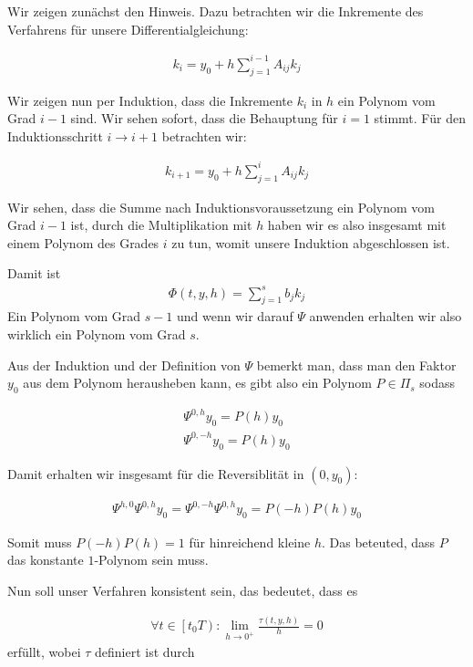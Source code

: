 \begin{solution}
  Wir zeigen zunächst den Hinweis. Dazu betrachten wir die Inkremente des Verfahrens
  für unsere Differentialgleichung:

  \begin{align*}
    k_i = y_0 + h \sum_{j=1}^{i-1}A_{ij}k_j
  \end{align*}

  Wir zeigen nun per Induktion, dass die Inkremente $k_i$ in $h$ ein Polynom vom Grad
  $i-1$ sind. Wir sehen sofort, dass die Behauptung für $i=1$ stimmt. Für den
  Induktionsschritt $i \rightarrow i+1$ betrachten wir:

  \begin{align*}
    k_{i+1} = y_0 + h \sum_{j=1}^iA_{ij}k_j
  \end{align*}

  Wir sehen, dass die Summe nach Induktionsvoraussetzung ein Polynom vom Grad
  $i-1$ ist, durch die Multiplikation mit $h$ haben wir es also insgesamt mit einem
  Polynom des Grades $i$ zu tun, womit unsere Induktion abgeschlossen ist.

  Damit ist
  \begin{align*}
    \Phi(t,y,h) = \sum_{j=1}^s b_j k_j
  \end{align*}
  Ein Polynom vom Grad $s-1$ und wenn wir darauf $\Psi$ anwenden erhalten wir also
  wirklich ein Polynom vom Grad $s$.

  Aus der Induktion und der Definition von $\Psi$ bemerkt man, dass man den Faktor
  $y_0$ aus dem Polynom herausheben kann, es gibt also ein Polynom $P \in \Pi_s$
  sodass

  \begin{align*}
    \Psi^{0,h} y_0 = P(h)y_0 \\
    \Psi^{0,-h} y_0 = P(h)y_0
  \end{align*}

  Damit erhalten wir insgesamt für die Reversiblität in $(0,y_0)$:

  \begin{align*}
    \Psi^{h,0}\Psi^{0,h}y_0 = \Psi^{0,-h}\Psi^{0,h}y_0
    = P(-h)P(h)y_0
  \end{align*}

  Somit muss $P(-h)P(h) = 1$ für hinreichend kleine $h$. Das beteuted, dass $P$
  das konstante $1$-Polynom sein muss.

  Nun soll unser Verfahren konsistent sein, das bedeutet, dass es

  \begin{align*}
    \forall t \in \left[t_0 T\right): \lim_{h\rightarrow 0^+}
    \frac{\tau(t,y,h)}{h} = 0
  \end{align*}
  erfüllt, wobei $\tau$ definiert ist durch


\end{solution}
